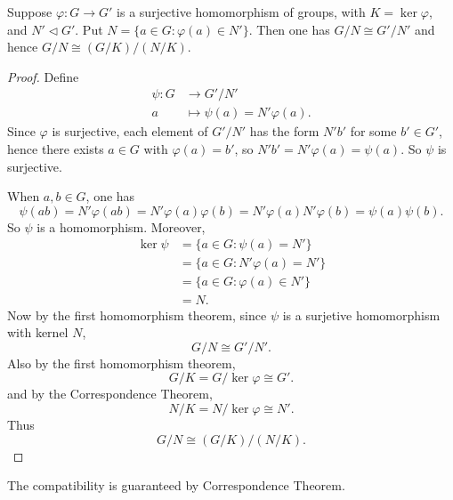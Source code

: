 
\begin{theorem}
	Suppose $\varphi: G \to  G'$ is a surjective homomorphism of groups, with $K = \operatorname{ker} \varphi$, and $N' \triangleleft G'$. Put $N = \{a \in G: \varphi(a) \in N'\} $. Then one has $G / N \cong G ' / N '$ and hence $G / N \cong (G / K)/ (N / K)$.
\end{theorem}
\begin{proof}
	Define \begin{align*}
		\psi: G &\longrightarrow G' / N' \\
		a &\longmapsto \psi(a) = N'\varphi(a)
	.\end{align*}
	Since $\varphi$ is surjective, each element of $G' / N'$ has the form $N' b'$ for some $b'\in G'$, hence there exists $a \in G$ with $\varphi(a) = b'$, so $N'b' = N'\varphi(a) = \psi(a)$. So $\psi$ is surjective.

	When $a,b \in G$, one has \[
		\psi(ab) = N'\varphi(ab) = N'\varphi(a)\varphi(b) = N'\varphi(a)N'\varphi(b) = \psi(a)\psi(b)
	.\] 
	So $\psi$ is a homomorphism.
	Moreover,
	 \begin{align*}
		\operatorname{ker} \psi 
		&= \{a \in G: \psi(a) = N'\}  \\
		&= \{a \in G: N'\varphi(a) = N'\}  \\
		&= \{a \in G: \varphi(a) \in N'\}  \\
		&= N
	.\end{align*}
	Now by the first homomorphism theorem, since $\psi$ is a surjetive homomorphism with kernel $N$, \[
		G / N \cong G' / N'
	.\] 
	Also by the first homomorphism theorem, \[
		G / K = G / \operatorname{ker} \varphi \cong G'
	.\] 
	and by the Correspondence Theorem, \[
		N / K = N /\operatorname{ker}  \varphi \cong N'
	.\] 
	Thus \[
		G / N \cong (G / K) / (N / K)
	.\] 
\end{proof}

\begin{remark}
	The compatibility is guaranteed by Correspondence Theorem.
\end{remark}

